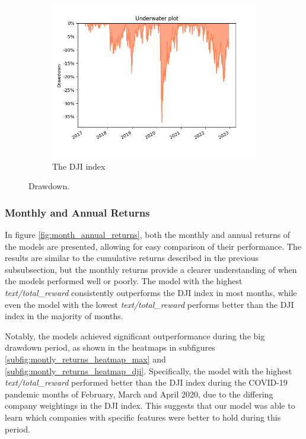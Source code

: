 \documentclass[../xlapes02]{subfiles}
\begin{document}
\begin{figure}[h!]
\begin{subfigure}[t]{\experimentimgwidth\textwidth}
            \includegraphics[width=\linewidth]{image/figure/drawdown_underwater_dji}
            \caption{The DJI index}
            \label{fig:drawdown_underwater_dji}
        \end{subfigure}
        \caption{Drawdown.}
        \label{fig:drawdown}
    \end{figure}

    \subsubsection{Monthly and Annual Returns}
    In figure \cref{fig:month_annual_returns}, both the monthly and annual returns of the models are presented, allowing for easy comparison of their performance. The results are similar to the cumulative returns described in the previous subsubsection, but the monthly returns provide a clearer understanding of when the models performed well or poorly. The model with the highest \emph{text/total\_reward} consistently outperforms the DJI index in most months, while even the model with the lowest \emph{text/total\_reward} performs better than the DJI index in the majority of months.

    Notably, the models achieved significant outperformance during the big drawdown period, as shown in the heatmaps in subfigures \cref{subfig:montly_returns_heatmap_max} and \cref{subfig:montly_returns_heatmap_dji}. Specifically, the model with the highest \emph{text/total\_reward} performed better than the DJI index during the COVID-19 pandemic months of February, March and April 2020, due to the differing company weightings in the DJI index. This suggests that our model was able to learn which companies with specific features were better to hold during this period.
\end{document}
